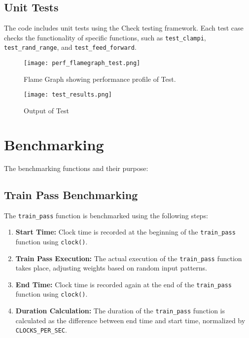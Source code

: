\documentclass{article}
\begin{document}
\subsection{Unit Tests}
The code includes unit tests using the Check testing framework. Each test case checks the functionality of specific functions, such as \texttt{test\_clampi}, \texttt{test\_rand\_range}, and \texttt{test\_feed\_forward}.

\begin{figure}[h]
  \centering
  \texttt{[image: perf\_flamegraph\_test.png]} 
  \caption{Flame Graph showing performance profile of Test.}
  \label{fig:perf_flamegraph}
\end{figure}

\begin{figure}[h]
    \centering
    \texttt{[image: test\_results.png]}
    \caption{Output of Test}
    \label{fig:enter-label}
\end{figure}

\section{Benchmarking}

The benchmarking functions and their purpose:

\subsection{Train Pass Benchmarking}
The \texttt{train\_pass} function is benchmarked using the following steps:
\begin{enumerate}
    \item \textbf{Start Time:} Clock time is recorded at the beginning of the \texttt{train\_pass} function using \texttt{clock()}.
    
    \item \textbf{Train Pass Execution:} The actual execution of the \texttt{train\_pass} function takes place, adjusting weights based on random input patterns.
    
    \item \textbf{End Time:} Clock time is recorded again at the end of the \texttt{train\_pass} function using \texttt{clock()}.
    
    \item \textbf{Duration Calculation:} The duration of the \texttt{train\_pass} function is calculated as the difference between end time and start time, normalized by \texttt{CLOCKS\_PER\_SEC}.
\end{enumerate}
\end{document}
